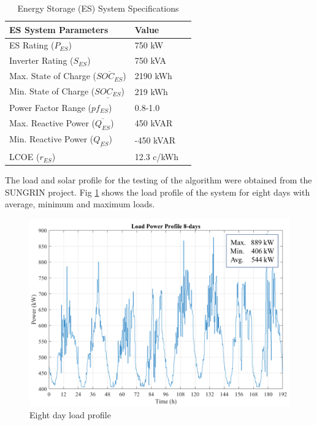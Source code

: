 \begin{table}[htb]
\normalsize
\renewcommand{\arraystretch}{1}
\caption{Energy Storage (ES) System Specifications}
\label{tab:es}
\centering
    \begin{tabular}{ | l | p{3cm} | p{3cm} | }
    \hline
    \textbf{ES System Parameters} & \textbf{Value} \\ \hline
    ES Rating (\(P_{ES}\)) & 750 kW  \\ \hline
    Inverter Rating (\(S_{ES}\)) & 750 kVA \\ \hline
    Max. State of Charge  (\(\overline{SOC_{ES}}\)) & 2190 kWh \\ \hline
    Min. State of Charge  (\(\underline{SOC_{ES}}\)) & 219 kWh \\ \hline
    Power Factor Range (\(pf_{ES}\)) & 0.8-1.0  \\ \hline
    Max. Reactive Power (\(\overline{Q_{ES}}\)) & 450 kVAR \\ \hline
    Min. Reactive Power (\(\underline{Q_{ES}}\)) & -450 kVAR \\ \hline
    LCOE (\(r_{ES}\)) & 12.3 c/kWh \\ \hline
    \end{tabular}
\end{table}

The load and solar profile for the testing of the algorithm were obtained from the SUNGRIN project. Fig \ref{fig:LOAD_PROFILE_8} shows the load profile of the system for eight days with average, minimum and maximum loads.

\begin{figure}[!ht]
    \centering
    \includegraphics[width = \linewidth]{figs/loadprofile.png}
    \caption{Eight day load profile}
    \label{fig:LOAD_PROFILE_8}
\end{figure}

